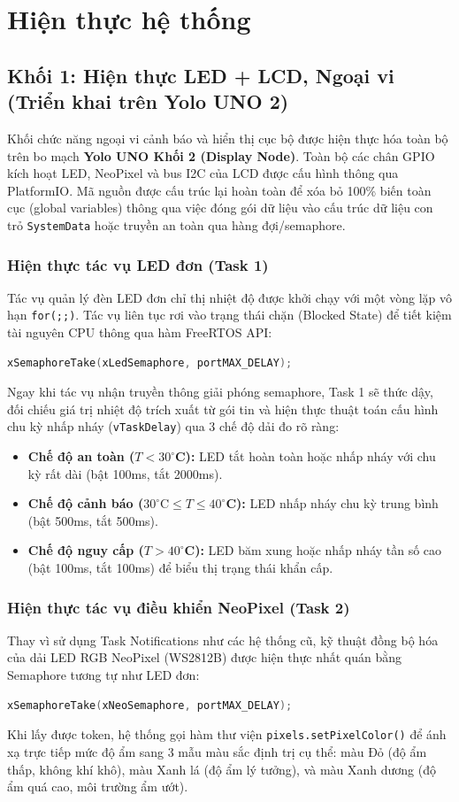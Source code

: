 \section{Hiện thực hệ thống}

\subsection{Khối 1: Hiện thực LED + LCD, Ngoại vi (Triển khai trên Yolo UNO 2)}
Khối chức năng ngoại vi cảnh báo và hiển thị cục bộ được hiện thực hóa toàn bộ trên bo mạch \textbf{Yolo UNO Khối 2 (Display Node)}. Toàn bộ các chân GPIO kích hoạt LED, NeoPixel và bus I2C của LCD được cấu hình thông qua PlatformIO. Mã nguồn được cấu trúc lại hoàn toàn để xóa bỏ 100\% biến toàn cục (global variables) thông qua việc đóng gói dữ liệu vào cấu trúc dữ liệu con trỏ \texttt{SystemData} hoặc truyền an toàn qua hàng đợi/semaphore.

\subsubsection{Hiện thực tác vụ LED đơn (Task 1)}
Tác vụ quản lý đèn LED đơn chỉ thị nhiệt độ được khởi chạy với một vòng lặp vô hạn \texttt{for(;;)}. Tác vụ liên tục rơi vào trạng thái chặn (Blocked State) để tiết kiệm tài nguyên CPU thông qua hàm FreeRTOS API:
\begin{lstlisting}[language=C++]
xSemaphoreTake(xLedSemaphore, portMAX_DELAY);
\end{lstlisting}
Ngay khi tác vụ nhận truyền thông giải phóng semaphore, Task 1 sẽ thức dậy, đối chiếu giá trị nhiệt độ trích xuất từ gói tin và hiện thực thuật toán cấu hình chu kỳ nhấp nháy (\texttt{vTaskDelay}) qua 3 chế độ dải đo rõ ràng:
\begin{itemize}
    \item \textbf{Chế độ an toàn ($T < 30^{\circ}$C):} LED tắt hoàn toàn hoặc nhấp nháy với chu kỳ rất dài (bật 100ms, tắt 2000ms).
    \item \textbf{Chế độ cảnh báo ($30^{\circ}\text{C} \le T \le 40^{\circ}$C):} LED nhấp nháy chu kỳ trung bình (bật 500ms, tắt 500ms).
    \item \textbf{Chế độ nguy cấp ($T > 40^{\circ}$C):} LED băm xung hoặc nhấp nháy tần số cao (bật 100ms, tắt 100ms) để biểu thị trạng thái khẩn cấp.
\end{itemize}

\subsubsection{Hiện thực tác vụ điều khiển NeoPixel (Task 2)}
Thay vì sử dụng Task Notifications như các hệ thống cũ, kỹ thuật đồng bộ hóa của dải LED RGB NeoPixel (WS2812B) được hiện thực nhất quán bằng Semaphore tương tự như LED đơn:
\begin{lstlisting}[language=C++]
xSemaphoreTake(xNeoSemaphore, portMAX_DELAY);
\end{lstlisting}
Khi lấy được token, hệ thống gọi hàm thư viện \texttt{pixels.setPixelColor()} để ánh xạ trực tiếp mức độ ẩm sang 3 mẫu màu sắc định trị cụ thể: màu Đỏ (độ ẩm thấp, không khí khô), màu Xanh lá (độ ẩm lý tưởng), và màu Xanh dương (độ ẩm quá cao, môi trường ẩm ướt).


